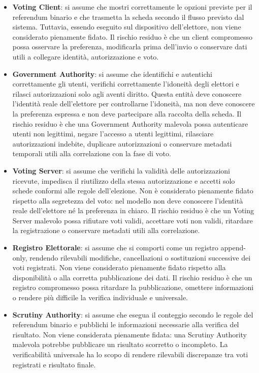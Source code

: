 \documentclass[a4paper,12pt]{article}
\begin{document}
\begin{itemize}

    \item \textbf{Voting Client}: si assume che mostri correttamente le opzioni previste per il referendum
    binario e che trasmetta la scheda secondo il flusso previsto dal sistema. Tuttavia, essendo eseguito
    sul dispositivo dell'elettore, non viene considerato pienamente fidato. Il rischio residuo è che un client
    compromesso possa osservare la preferenza, modificarla prima dell'invio o conservare dati utili a collegare
    identità, autorizzazione e voto.

    
    \item \textbf{Government Authority}: si assume che identifichi e autentichi
    correttamente gli utenti, verifichi correttamente l'idoneità degli elettori e rilasci
    autorizzazioni solo agli aventi diritto. Questa entità deve conoscere l'identità
    reale dell'elettore per controllarne l'idoneità, ma non deve conoscere la preferenza
    espressa e non deve partecipare alla raccolta della scheda. Il rischio residuo è
    che una Government Authority malevola possa autenticare utenti non legittimi,
    negare l'accesso a utenti legittimi, rilasciare autorizzazioni indebite, duplicare
    autorizzazioni o conservare metadati temporali utili alla correlazione con la fase
    di voto.
    \item \textbf{Voting Server}: si assume che verifichi la validità delle autorizzazioni ricevute, impedisca
    il riutilizzo della stessa autorizzazione e accetti solo schede conformi alle regole dell'elezione.
    Non è considerato pienamente fidato rispetto alla segretezza del voto: nel modello non deve conoscere
    l'identità reale dell'elettore né la preferenza in chiaro. Il rischio residuo è che un Voting Server malevolo
    possa rifiutare voti validi, accettare voti non validi, ritardare la registrazione o conservare metadati utili
    alla correlazione.

    \item \textbf{Registro Elettorale}: si assume che si comporti come un registro append-only, rendendo
    rilevabili modifiche, cancellazioni o sostituzioni successive dei voti registrati. Non viene considerato
    pienamente fidato rispetto alla disponibilità o alla corretta pubblicazione dei dati. Il rischio residuo è
    che un registro compromesso possa ritardare la pubblicazione, omettere informazioni o rendere più difficile
    la verifica individuale e universale.

    \item \textbf{Scrutiny Authority}: si assume che esegua il conteggio secondo le regole del referendum binario
    e pubblichi le informazioni necessarie alla verifica del risultato. Non viene considerata pienamente fidata:
    una Scrutiny Authority malevola potrebbe pubblicare un risultato scorretto o incompleto. La verificabilità
    universale ha lo scopo di rendere rilevabili discrepanze tra voti registrati e risultato finale.

\end{itemize}
\end{document}
